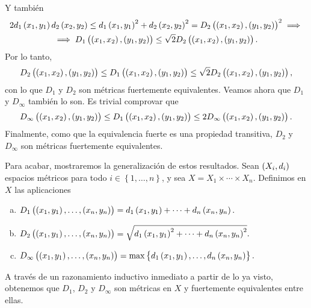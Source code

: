 \begin{ej}
\[    \]
    Y también
    \begin{gather*}
        2d_1\left( x_1, y_1 \right) d_2 \left( x_2, y_2 \right) \leq d_1\left( x_1, y_1 \right) ^2 + d_2 \left( x_2, y_2 \right) ^2 = D_2 \left( \left( x_1, x_2 \right) , \left( y_1 , y_2 \right) \right)^2 \implies \\
        \implies D_1 \left( \left( x_1, x_2 \right) , \left( y_1 , y_2 \right) \right) \leq \sqrt{2} D_2 \left( \left( x_1, x_2 \right) , \left( y_1 , y_2 \right) \right).
    \end{gather*}
    Por lo tanto,
    \[
        D_2 \left( \left( x_1, x_2 \right) , \left( y_1 , y_2 \right) \right) \leq D_1 \left( \left( x_1, x_2 \right) , \left( y_1 , y_2 \right) \right) \leq \sqrt{2} D_2 \left( \left( x_1, x_2 \right) , \left( y_1 , y_2 \right) \right),
    \]
    con lo que $D_1$ y $D_2$ son métricas fuertemente equivalentes. Veamos ahora que $D_1$ y $D_{\infty}$ también lo son. Es trivial comprovar que
    \[
        D_{\infty} \left( \left( x_1, x_2 \right) , \left( y_1 , y_2 \right) \right) \leq D_1 \left( \left( x_1, x_2 \right) , \left( y_1 , y_2 \right) \right) \leq 2 D_{\infty} \left( \left( x_1, x_2 \right) , \left( y_1 , y_2 \right) \right).
    \]
    Finalmente, como que la equivalencia fuerte es una propiedad transitiva, $D_2$ y $D_{\infty}$ son métricas fuertemente equivalentes.
    
    Para acabar, mostraremos la generalización de estos resultados. Sean $\left( X_i, d_i \right)$ espacios métricos para todo $i \in \left\{1, \dots , n \right\}$, y sea $X=X_1 \times \cdots \times X_n$. Definimos en $X$ las aplicaciones
    \begin{enumerate}[(a)]
        \item $D_1\left( \left( x_1, y_1 \right), \dots , \left( x_n, y_n \right) \right) = d_1\left( x_1, y_1 \right) + \cdots + d_n \left( x_n, y_n \right).$
        \item $D_2\left( \left( x_1, y_1 \right), \dots , \left( x_n, y_n \right) \right) = \sqrt{d_1\left( x_1, y_1 \right)^2 + \cdots + d_n \left( x_n, y_n \right)^2}.$
        \item $D_{\infty}\left( \left( x_1, y_1 \right), \dots , \left( x_n, y_n \right) \right) = \max \left\{d_1\left( x_1, y_1 \right), \dots, d_n \left( x_n, y_n \right) \right\}.$
    \end{enumerate}
    A través de un razonamiento inductivo inmediato a partir de lo ya visto, obtenemos que $D_1$, $D_2$ y $D_{\infty}$ son métricas en $X$ y fuertemente equivalentes entre ellas.
\end{ej}
